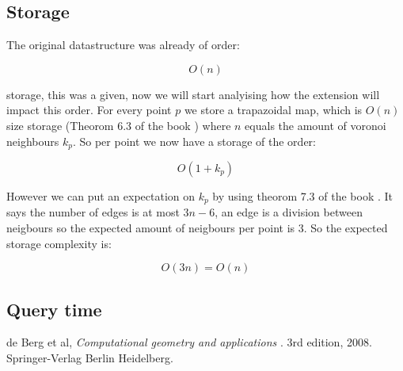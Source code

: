 \documentclass{article}
\begin{document}
\subsection{Storage}
The original datastructure was already of order:

\[O(n)\]

storage, this was a given, now we will start analyising how the extension
will impact this order.
For every point $p$ we store a trapazoidal map, which is $O(n)$ size
storage (Theorom 6.3 of the book \cite{book}) where $n$ equals the amount of
voronoi neighbours $k_p$. So per point we now have a storage of the order:

\[O(1+k_p)\]

However we can put an expectation on $k_p$ by using theorom 7.3 of the book
\cite{book}. It says the number of edges is at most $3n-6$, an edge is a
division between neigbours so the expected amount of neigbours per point
is $3$. So the expected storage complexity is:

\[ O(3n) = O(n) \]
\subsection{Query time}

\begin{thebibliography}{9}
de Berg et al,
\textit{Computational geometry and applications }.
3rd edition, 2008. Springer-Verlag Berlin Heidelberg.
\end{thebibliography}
\end{document}
